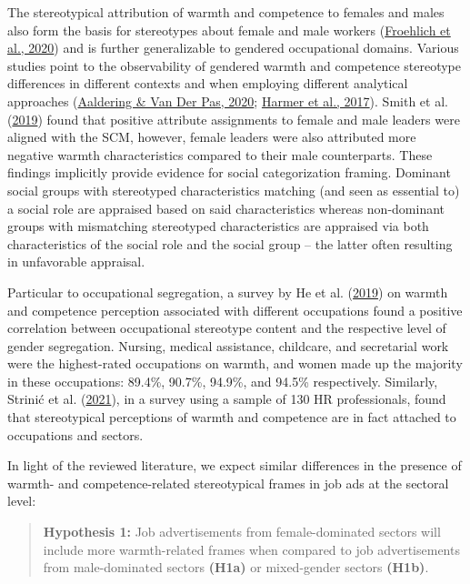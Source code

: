 \documentclass[
  12pt,
  letterpaper,
  DIV=11,
  numbers=noendperiod]{scrartcl}
\begin{document}
The stereotypical attribution of warmth and competence to females and
males also form the basis for stereotypes about female and male workers
(\protect\hyperlink{ref-froehlich2020GenderWorkNations}{Froehlich et
al., 2020}) and is further generalizable to gendered occupational
domains. Various studies point to the observability of gendered warmth
and competence stereotype differences in different contexts and when
employing different analytical approaches
(\protect\hyperlink{ref-aaldering2020PoliticalLeadershipMedia}{Aaldering
\& Van Der Pas, 2020}; \protect\hyperlink{ref-harmer_are_2017}{Harmer et
al., 2017}). Smith et al.
(\protect\hyperlink{ref-smith2019PowerLanguageGender}{2019}) found that
positive attribute assignments to female and male leaders were aligned
with the SCM, however, female leaders were also attributed more negative
warmth characteristics compared to their male counterparts. These
findings implicitly provide evidence for social categorization framing.
Dominant social groups with stereotyped characteristics matching (and
seen as essential to) a social role are appraised based on said
characteristics whereas non-dominant groups with mismatching stereotyped
characteristics are appraised via both characteristics of the social
role and the social group -- the latter often resulting in unfavorable
appraisal.

Particular to occupational segregation, a survey by He et al.
(\protect\hyperlink{ref-he2019StereotypesWorkOccupational}{2019}) on
warmth and competence perception associated with different occupations
found a positive correlation between occupational stereotype content and
the respective level of gender segregation. Nursing, medical assistance,
childcare, and secretarial work were the highest-rated occupations on
warmth, and women made up the majority in these occupations: 89.4\%,
90.7\%, 94.9\%, and 94.5\% respectively. Similarly, Strinić et al.
(\protect\hyperlink{ref-strinic2021OccupationalStereotypesProfessionals}{2021}),
in a survey using a sample of 130 HR professionals, found that
stereotypical perceptions of warmth and competence are in fact attached
to occupations and sectors.

In light of the reviewed literature, we expect similar differences in
the presence of warmth- and competence-related stereotypical frames in
job ads at the sectoral level:

\begin{quote}
\textbf{Hypothesis 1:} Job advertisements from female-dominated sectors
will include more warmth-related frames when compared to job
advertisements from male-dominated sectors \textbf{(H1a)} or
mixed-gender sectors \textbf{(H1b)}.
\end{quote}
\end{document}

